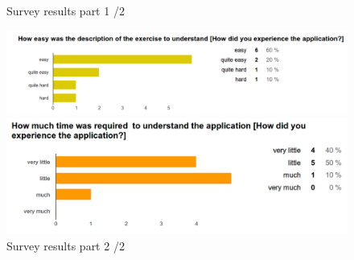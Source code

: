 \begin{figure}[b!]
\begin{minipage}{0.7\textwidth}
    \end{minipage}
  \caption{Survey results part 1 /2 }
  \label{fig:survey1}
\end{figure}

\begin{figure}[b!]
  \centering
    \begin{minipage}{0.7\textwidth}
      \centering
        \includegraphics[width=1\textwidth]{00_resources/figures/survey_results4.png}
    \end{minipage}
    \begin{minipage}{0.7\textwidth}
      \centering
        \includegraphics[width=1\textwidth]{00_resources/figures/survey_results5.png}
    \end{minipage}
  \caption{Survey results part 2 /2 }
  \label{fig:survey2}
\end{figure}
